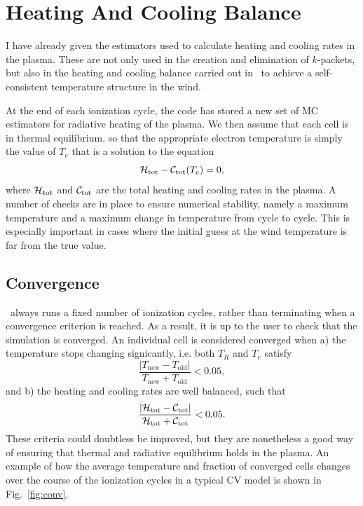 \section{Heating And Cooling Balance}
\label{sec:heating_cooling}
I have already given the estimators used to calculate
heating and cooling rates in the plasma. These are not only used
in the creation and elimination of $k$-packets, but also in the heating
and cooling balance carried out in \py\ to achieve a self-consistent
temperature structure in the wind. 

At the end of each ionization cycle, the code has stored a new set
of MC estimators for radiative heating of the plasma. We then
assume that each cell is in thermal equilibrium, so that the appropriate
electron temperature is simply the value of $T_e$ that is a solution
to the equation
\begin{equation}
{\cal H}_{\mathrm{tot}} - {\cal C}_{\mathrm{tot}} ( T_e) = 0,
\end{equation}
where ${\cal H}_{\mathrm{tot}}$ and ${\cal C}_{\mathrm{tot}}$ are the total heating and cooling rates in 
the plasma. A number of checks are in place to ensure numerical stability,
namely a maximum temperature and a maximum change in temperature from cycle
to cycle. This is especially important in cases where the initial
guess at the wind temperature is far from the true value.

\subsection{Convergence}

\label{sec:convergence}
\py\ always runs a fixed number of ionization cycles, rather than terminating
when a convergence criterion is reached. As a result, it is up to the user
to check that the simulation is converged. An individual cell is considered
converged when a) the temperature stops changing signicantly, i.e. both
$T_R$ and $T_e$ satisfy
\begin{equation}
\frac{|T_{\mathrm{new}} - T_{\mathrm{old}}|}{T_{\mathrm{new}} + T_{\mathrm{old}}} < 0.05,
\end{equation}
and b) the heating and cooling rates are well balanced, such that
\begin{equation}
\frac{|{\cal H}_{\mathrm{tot}} - {\cal C}_{\mathrm{tot}}|}{{\cal H}_{\mathrm{tot}} + {\cal C}_{\mathrm{tot}}} < 0.05.
\end{equation}
These criteria could doubtless be improved, but they are nonetheless
a good way of ensuring that thermal and radiative equilibrium holds in the 
plasma. An example of how the average temperature and fraction
of converged cells changes over the course of the ionization cycles in
a typical CV model is shown in Fig.~\ref{fig:conv}.


